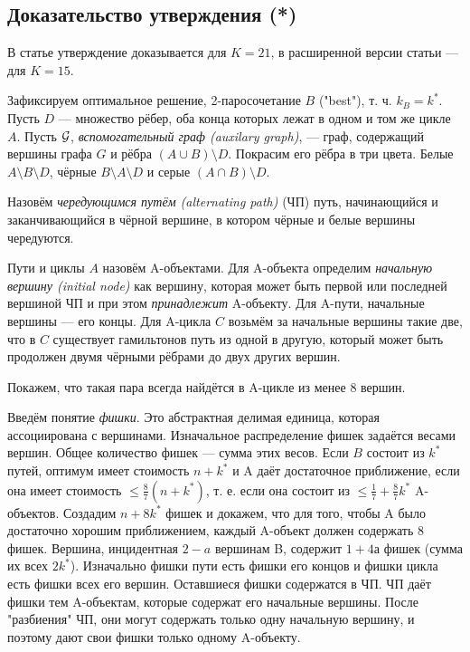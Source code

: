 \subsection{Доказательство утверждения (*)}
В статье \cite{BK06} утверждение доказывается для $K=21$, в расширенной версии статьи --- для $K=15$.
\begin{proofstar}
Зафиксируем оптимальное решение, 2-паросочетание $B$ ("best"), т. ч. $k_B = k^*$. Пусть $D$ --- множество рёбер, оба конца которых лежат в одном и том же цикле $A$. Пусть $\mathcal{G}$, \textit{вспомогательный граф (auxilary graph)}, --- граф, содержащий вершины графа $G$ и рёбра $(A \cup B) \setminus D$. Покрасим его рёбра в три цвета.
Белые $A \setminus B \setminus D$, чёрные $B \setminus A \setminus D$ и серые $(A \cap B) \setminus D$. 

Назовём \textit{чередующимся путём (alternating path)} (ЧП) путь, начинающийся и заканчивающийся в чёрной вершине, в котором чёрные и белые вершины чередуются.

Пути и циклы $A$ назовём A-объектами. Для A-объекта определим \textit{начальную вершину (initial node)} как вершину, которая может быть первой или последней вершиной ЧП и при этом \textit{принадлежит} A-объекту. Для A-пути, начальные вершины --- его концы. Для A-цикла $C$ возьмём за начальные вершины такие две, что в $C$ существует гамильтонов путь из одной в другую, который может быть продолжен двумя чёрными рёбрами до двух других вершин. 

Покажем, что такая пара всегда найдётся в A-цикле из менее 8 вершин.

Введём понятие \textit{фишки}. Это абстрактная делимая единица, которая ассоциирована с вершинами. Изначальное распределение фишек задаётся весами вершин. Общее количество фишек --- сумма этих весов.
Если $B$ состоит из $k^*$ путей, оптимум имеет стоимость $n+k^*$ и A даёт достаточное приближение, если она имеет стоимость $\le \frac{8}{7}(n+k^*)$, т. е. если она состоит из $\le \frac{1}{7} + \frac{8}{7}k^*$ A-объектов. Создадим $n+8k^*$ фишек и докажем, что для того, чтобы A было достаточно хорошим приближением, каждый A-объект должен содержать 8 фишек.
Вершина, инцидентная $2-a$ вершинам B, содержит $1+4а$ фишек (сумма их всех $2k^*$). Изначально фишки пути есть фишки его концов и фишки цикла есть фишки всех его вершин. Оставшиеся фишки содержатся в ЧП. ЧП даёт фишки тем A-объектам, которые содержат его начальные вершины. После "разбиения" ЧП, они могут содержать только одну начальную вершину, и поэтому дают свои фишки только одному A-объекту.


\end{proofstar}
